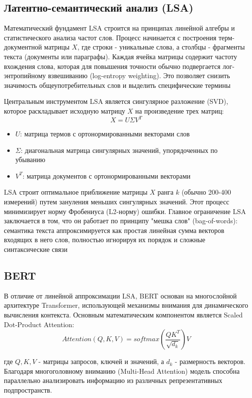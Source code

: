 \documentclass{article}
\begin{document}
\subsection{Латентно-семантический анализ (LSA)}

Математический фундамент LSA строится на принципах линейной алгебры и
статистического анализа частот слов. Процесс начинается с построения
терм-документной матрицы \( X \), где строки - уникальные слова, а столбцы -
фрагменты текста (документы или параграфы). Каждая ячейка матрицы содержит
частоту вхождения слова, которая для повышения точности обычно подвергается
лог-энтропийному взвешиванию (log-entropy weighting). Это позволяет снизить
значимость общеупотребительных слов и выделить специфические термины

Центральным инструментом LSA является сингулярное разложение (SVD), которое
раскладывает исходную матрицу \( X \) на произведение трех матриц:
\[
  X = U \Sigma V^T
\]
\begin{itemize}
  \item \( U \): матрица термов с ортонормированными векторами слов
  \item  \( \Sigma \): диагональная матрица сингулярных значений, упорядоченных
    по убыванию
  \item \( V^T \): матрица документов с ортонормированными векторами
\end{itemize}

LSA строит оптимальное приближение матрицы \( X \) ранга \( k \)
(обычно 200-400 измерений) путем зануления меньших сингулярных
значений. Этот процесс минимизирует норму Фробениуса (L2-норму)
ошибки. Главное ограничение LSA заключается в том, что он работает по
принципу "мешка слов" (bag-of-words): семантика текста
аппроксимируется как простая линейная сумма векторов входящих в него
слов, полностью игнорируя их порядок и сложные синтаксические связи

\subsection{BERT}

В отличие от линейной аппроксимации LSA, BERT основан на многослойной
архитектуре Transformer, использующей механизмы внимания для динамического
вычисления контекста. Основным математическим компонентом является Scaled
Dot-Product Attention:
\[
  Attention(Q, K, V) = softmax(\frac{QK^T}{\sqrt{d_k}})V
\]

где \( Q, K, V \) - матрицы запросов, ключей и значений, а \( d_k \) -
размерность векторов. Благодаря многоголовному вниманию (Multi-Head Attention)
модель способна параллельно анализировать информацию из различных
репрезентативных подпространств.
\end{document}
